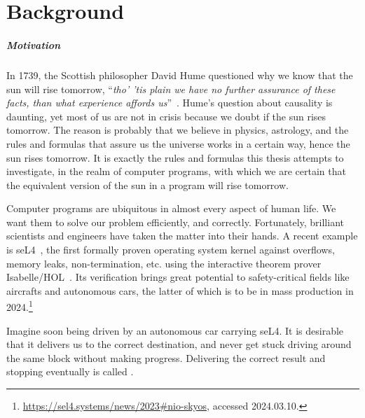 \chapter{Background}\label{ch:background}
\renewcommand{\thefigure}{\arabic{chapter}.\arabic{figure}}
\renewcommand{\thetable}{\arabic{chapter}.\arabic{table}}

\paragraph{Motivation}
In 1739, the Scottish philosopher David Hume questioned why we know that the sun will rise tomorrow, ``\textit{tho' 'tis plain we have no further assurance of these facts, than what experience affords us}''~\cite{hume1896}. 
Hume's question about causality is daunting, yet most of us are not in crisis because we doubt if the sun rises tomorrow. 
The reason is probably that we believe in physics, astrology, and the rules and formulas that assure us the universe works in a certain way, hence the sun rises tomorrow. 
It is exactly the rules and formulas this thesis attempts to investigate, in the realm of computer programs, with which we are certain that the equivalent version of the sun in a program will rise tomorrow. 

Computer programs are ubiquitous in almost every aspect of human life. 
We want them to solve our problem efficiently, and correctly. 
Fortunately, brilliant scientists and engineers have taken the matter into their hands. 
A recent example is seL4~\cite{klein09}, the first formally proven operating system kernel against overflows, memory leaks, non-termination, etc. using the interactive theorem prover Isabelle/HOL~\cite{nipkow2002isabelle}. 
Its verification brings great potential to safety-critical fields like aircrafts and autonomous cars, the latter of which is to be in mass production in 2024.\footnote{\url{https://sel4.systems/news/2023\#nio-skyos}, accessed 2024.03.10. }

Imagine soon being driven by an autonomous car carrying seL4. 
It is desirable that it delivers us to the correct destination, and never get stuck driving around the same block without making progress. 
Delivering the correct result and stopping eventually is called . 

